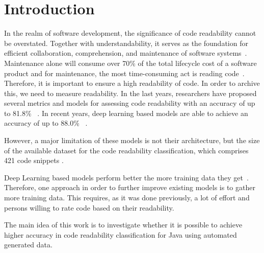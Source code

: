 \documentclass[%
class=scrreprt,
chapterprefix=false,%
open=right,%
twoside=false,%
paper=a4,%
logofile={Logo\_zentral\_farbig\_EN.png},%
thesistype=master,%
UKenglish,%
]{se2thesis}
\theoremstyle{definition}
\newcommand{\citeclassicmodels}{\cite{buse2009learning, posnett2011simpler, dorn2012general, scalabrino2018comprehensive} }
\newcommand{\citedeepmodels}{\cite{mi2018inception, mi2018improving, sharma2020egan, mi2022towards, mi2022rank, mi2023graph} }
\newcommand{\citeolddataset}{\cite{buse2009learning, dorn2012general, scalabrino2018comprehensive} }
\begin{document}
	\mainmatter
	
	\tableofcontents
	
\section{Introduction} \label{Introduction}

	In the realm of software development, the significance of code readability cannot be overstated. Together with understandability, it serves as the foundation for efficient collaboration, comprehension, and maintenance of software systems~\cite{posnett2011simpler, aggarwal2002integrated}. 
	Maintenance alone will consume over 70\% of the total lifecycle cost of a software product and for maintenance, the most time-consuming act is reading code~\cite{buse2009learning, deimel1985uses, rugaber2000use, boehm2001defect}.
	Therefore, it is important to ensure a high readability of code. In order to archive this, we need to measure readability.
	In the last years, researchers have proposed several metrics and models for assessing code readability with an accuracy of up to 81.8\%~\citeclassicmodels. In recent years, deep learning based models are able to achieve an accuracy of up to 88.0\%~\citedeepmodels.
	
	However, a major limitation of these models is not their architecture, but the size of the available dataset for the code readability classification, which comprises 421 code snippets \citeolddataset.
	
	Deep Learning based models perform better the more training data they get~\cite{hestness2017deep}. Therefore, one approach in order to further improve existing models is to gather more training data.
	This requires, as it was done previously, a lot of effort and persons willing to rate code based on their readability.
	
	The main idea of this work is to investigate whether it is possible to achieve higher accuracy in code readability classification for Java using automated generated data. 
	
\end{document}
